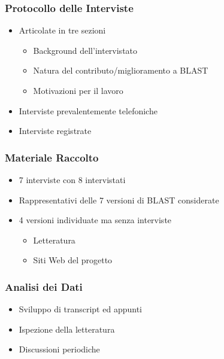 \begin{frame}\frametitle{Protocollo delle Interviste}

\Large

\begin{itemize}[<+->]
\itemsep1pt\parskip0pt
\item
  Articolate in tre sezioni

  \begin{itemize}[<+->]
  \itemsep1pt\parskip0pt
  \item
    Background dell'intervistato
  \item
    Natura del contributo/miglioramento a BLAST
  \item
    Motivazioni per il lavoro
  \end{itemize}
\item
  Interviste prevalentemente telefoniche
\item
  Interviste registrate
\end{itemize}

\end{frame}

\begin{frame}\frametitle{Materiale Raccolto}

\Large

\begin{itemize}[<+->]
\itemsep1pt\parskip0pt
\item
  7 interviste con 8 intervistati
\item
  Rappresentativi delle 7 versioni di BLAST considerate
\item
  4 versioni individuate ma senza interviste

  \begin{itemize}[<+->]
  \itemsep1pt\parskip0pt
  \item
    Letteratura
  \item
    Siti Web del progetto
  \end{itemize}
\end{itemize}

\end{frame}

\begin{frame}\frametitle{Analisi dei Dati}

\Large

\begin{itemize}[<+->]
\itemsep1pt\parskip0pt
\item
  Sviluppo di transcript ed appunti
\item
  Ispezione della letteratura
\item
  Discussioni periodiche
\end{itemize}

\end{frame}

